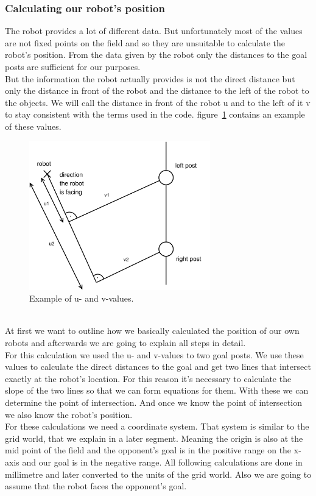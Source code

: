 \documentclass[lnicst,a4paper]{svmultln}
\begin{document}
\subsubsection{Calculating our robot's position}
The robot provides a lot of different data.
But unfortunately most of the values are not fixed points on the field and so they are unsuitable to calculate the robot's position. From the data given by the robot only the distances to the goal posts are sufficient for our purposes.
\\
But the information the robot actually provides is not the direct distance but only the distance in front of the robot and the distance to the left of the robot to the objects. We will call the distance in front of the robot u and to the left of it v to stay consistent with the terms used in the code. figure~\ref{fig:uvvalues} contains an example of these values.
\begin{figure}
 	\centerline{\includegraphics[width=0.7\textwidth]{uvvalues.pdf}}
	{\caption{Example of u- and v-values.}\label{fig:uvvalues}}
\end{figure}
\\
At first we want to outline how we basically calculated the position of our own robots and afterwards we are going to explain all steps in detail.
\\
For this calculation we used the u- and v-values to two goal posts. We use these values to calculate the direct distances to the goal and get two lines that intersect exactly at the robot's location. For this reason it's necessary to calculate the slope of the two lines so that we can form equations for them. With these we can determine the point of intersection. And once we know the point of intersection we also know the robot's position.
\\
For these calculations we need a coordinate system. That system is similar to the grid world, that we explain in a later segment. Meaning the origin is also at the mid point of the field and the opponent's goal is in the positive range on the x-axis and our goal is in the negative range. All following calculations are done in millimetre and later converted to the units of the grid world. Also we are going to assume that the robot faces the opponent's goal. 
\end{document}
